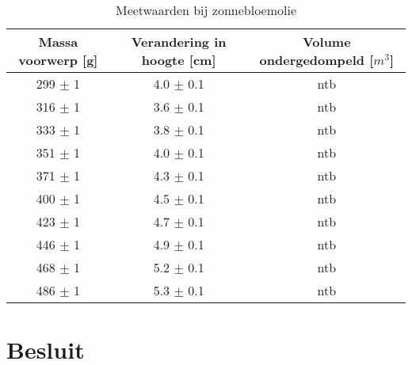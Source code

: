 \documentclass[10pt,a4paper,twoside]{article}
\begin{document}
\begin{table}
	\begin{center}
		\caption{Meetwaarden bij zonnebloemolie}
		\label{Tabel3}
		\begin{tabular}{|c|c|c|}
			\hline
			Massa voorwerp [g] & Verandering in hoogte [cm] & Volume ondergedompeld [$m^3$]\\
			\hline
			299 $\pm$ 1 & 4.0 $\pm$ 0.1 & ntb\\
			\hline
			316 $\pm$ 1 & 3.6 $\pm$ 0.1 & ntb\\
			\hline
			333 $\pm$ 1 & 3.8 $\pm$ 0.1 & ntb\\
			\hline
			351 $\pm$ 1 & 4.0 $\pm$ 0.1 & ntb\\
			\hline
			371 $\pm$ 1 & 4.3 $\pm$ 0.1 & ntb\\
			\hline
			400 $\pm$ 1 & 4.5 $\pm$ 0.1 & ntb\\
			\hline
			423 $\pm$ 1 & 4.7 $\pm$ 0.1 & ntb\\
			\hline
			446 $\pm$ 1 & 4.9 $\pm$ 0.1 & ntb\\
			\hline
			468 $\pm$ 1 & 5.2 $\pm$ 0.1 & ntb\\
			\hline
			486 $\pm$ 1 & 5.3 $\pm$ 0.1 & ntb\\
			\hline
		\end{tabular}
	\end{center}
\end{table}

\section{Besluit}
\end{document}
